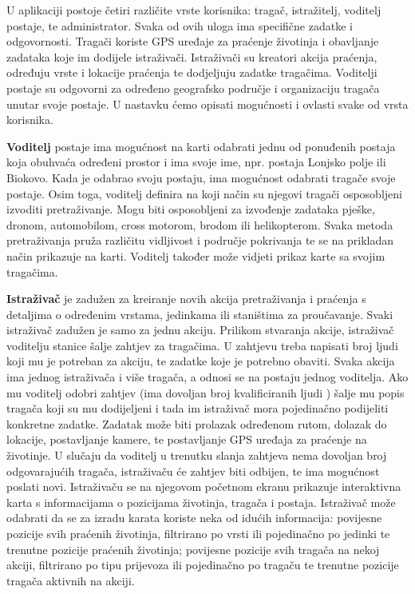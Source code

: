 		U aplikaciji postoje četiri različite vrste korisnika: tragač, istražitelj, voditelj postaje, te administrator. Svaka od ovih uloga ima specifične zadatke i odgovornosti. Tragači koriste GPS uređaje za praćenje životinja i obavljanje zadataka koje im dodijele istraživači. Istraživači su kreatori akcija praćenja, određuju vrste i lokacije praćenja te dodjeljuju zadatke tragačima. Voditelji postaje su odgovorni za određeno geografsko područje i organizaciju tragača unutar svoje postaje. U nastavku ćemo opisati mogućnosti i ovlasti svake od vrsta korisnika. \newline
		
		\textbf{Voditelj} postaje ima mogućnost na karti odabrati jednu od ponuđenih postaja koja obuhvaća određeni prostor i ima svoje ime, npr. postaja Lonjsko polje ili Biokovo. Kada je odabrao svoju postaju, ima mogućnost odabrati tragače svoje postaje. Osim toga, voditelj definira na koji način su njegovi tragači osposobljeni izvoditi pretraživanje. Mogu biti osposobljeni za izvođenje zadataka pješke, dronom, automobilom, cross motorom, brodom ili helikopterom. Svaka metoda pretraživanja pruža različitu vidljivost i područje pokrivanja te se na prikladan način prikazuje na karti. Voditelj također može vidjeti prikaz karte sa svojim tragačima. \newline
		
		\textbf{Istraživač} je zadužen za kreiranje novih akcija pretraživanja i praćenja s detaljima o određenim vrstama, jedinkama ili staništima za proučavanje. Svaki istraživač zadužen je samo za jednu akciju. Prilikom stvaranja akcije, istraživač voditelju stanice šalje zahtjev za tragačima. U zahtjevu treba napisati broj ljudi koji mu je potreban za akciju, te zadatke koje je potrebno obaviti. Svaka akcija ima jednog istraživača i više tragača, a odnosi se na postaju jednog voditelja. Ako mu voditelj odobri zahtjev (ima dovoljan broj kvalificiranih ljudi ) šalje mu popis tragača koji su mu dodijeljeni i tada im istraživač mora pojedinačno podijeliti konkretne zadatke. Zadatak može biti prolazak određenom rutom, dolazak do lokacije, postavljanje kamere, te postavljanje GPS uređaja za praćenje na životinje.  U slučaju da voditelj u trenutku slanja zahtjeva nema dovoljan broj odgovarajućih tragača, istraživaču će zahtjev biti odbijen, te ima mogućnost poslati novi. Istraživaču se na njegovom početnom ekranu prikazuje interaktivna karta s informacijama o pozicijama životinja, tragača i postaja. Istraživač može odabrati da se za izradu karata koriste neka od idućih informacija: povijesne pozicije svih praćenih životinja, filtrirano po vrsti ili pojedinačno po jedinki te trenutne pozicije praćenih životinja; povijesne pozicije svih tragača na nekoj akciji, filtrirano po tipu prijevoza ili pojedinačno po tragaču te trenutne pozicije tragača aktivnih na akciji. \newline
		

